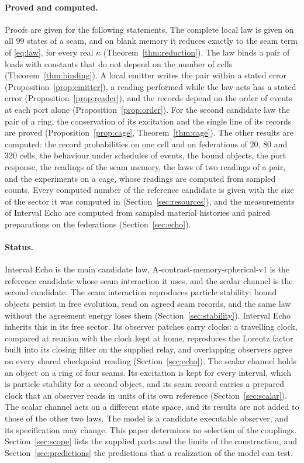 \documentclass[11pt]{article}
\theoremstyle{definition}
\theoremstyle{remark}
\theoremstyle{plain}
\begin{document}
\paragraph{Proved and computed.}
Proofs are given for the following statements. The complete local law is
given on all $99$ states of a seam, and on blank memory it reduces exactly
to the seam term of \eqref{eq:law}, for every real $\kappa$
(Theorem~\ref{thm:reduction}). The law
binds a pair of loads with constants that do not depend on the number of
cells (Theorem~\ref{thm:binding}). A local emitter writes the pair within a
stated error (Proposition~\ref{prop:emitter}), a reading performed while the
law acts has a stated error (Proposition~\ref{prop:reader}), and the records
depend on the order of events at each port alone
(Proposition~\ref{prop:order}). For the second candidate law the pair of a
ring, the conservation of its excitation and the single line of its records
are proved (Proposition~\ref{prop:cage}, Theorem~\ref{thm:cage}). The other
results are computed: the record probabilities on one cell and on
federations of $20$, $80$ and $320$ cells, the behaviour under schedules of
events, the bound objects, the port response, the readings of the seam
memory, the laws of two readings of a pair, and the experiments on a cage,
whose readings are computed from sampled counts. Every computed number of
the reference candidate is given with the size of the sector it was
computed in (Section~\ref{sec:resources}), and the measurements of Interval
Echo are computed from sampled material histories and paired preparations
on the federations (Section~\ref{sec:echo}).

\paragraph{Status.}
Interval Echo is the main candidate law, A-contrast-memory-spherical-v1 is
the reference candidate whose seam interaction it uses, and the scalar
channel is the second candidate. The seam interaction reproduces particle
stability: bound objects persist in free evolution, read on agreed seam
records, and the same law without the agreement energy loses them
(Section~\ref{sec:stability}). Interval Echo inherits this in its free
sector. Its observer patches carry clocks: a travelling clock, compared at
reunion with the clock kept at home, reproduces the Lorentz factor built into its closing filter on the supplied relay, and overlapping observers agree
on every shared checkpoint reading (Section~\ref{sec:echo}). The scalar
channel holds an object on a ring of four seams. Its excitation is kept for
every interval, which is particle stability for a second object, and its
seam record carries a prepared clock that an observer reads in units of its
own reference (Section~\ref{sec:scalar}). The scalar channel acts on a
different state space, and its results are not added to those of the other
two laws. The model is
a candidate executable observer, and its specification may change. This paper
determines no selection of the couplings. Section~\ref{sec:scope} lists the
supplied parts and the limits of the construction, and
Section~\ref{sec:predictions} the predictions that a realization of the
model can test.
\end{document}
